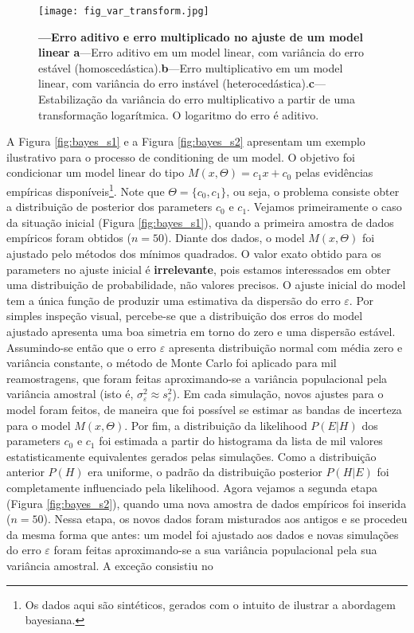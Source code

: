 \documentclass[./main.tex]{subfiles}
\begin{document}
\begin{figure}[t!] %
	\centering				
	\texttt{[image: fig\_var\_transform.jpg]}		
	\caption[Erro aditivo e erro multiplicativo]
	{\textbf{---\;Erro aditivo e erro multiplicado no ajuste de um \gls{model} linear}
        \;\textbf{a}\;---\;Erro aditivo em um \gls{model} linear, com variância do erro estável (homoscedástica).\;\textbf{b}\;---\;Erro multiplicativo em um \gls{model} linear, com variância do erro instável (heterocedástica).\;\textbf{c}\;---\;Estabilização da variância do erro multiplicativo a partir de uma transformação logarítmica. O logaritmo do erro é aditivo.
	}
\label{fig:var_transform}  %
\end{figure}
\par A Figura \ref{fig:bayes_s1} e a Figura \ref{fig:bayes_s2} apresentam um exemplo ilustrativo para o processo de \gls{conditioning} de um \gls{model}. O objetivo foi condicionar um \gls{model} linear do tipo $M(x, \Theta) = c_{1}x + c_{0}$ pelas evidências empíricas disponíveis\footnote{Os dados aqui são sintéticos, gerados com o intuito de ilustrar a abordagem bayesiana.}. Note que $\Theta=\{c_{0}, c_{1}\}$, ou seja, o problema consiste obter a distribuição de \gls{posterior} dos \gls{parameters} $c_0$ e $c_1$. Vejamos primeiramente o caso da situação inicial (Figura \ref{fig:bayes_s1}), quando a primeira amostra de dados empíricos foram obtidos ($n=50$). Diante dos dados, o \gls{model} $M(x, \Theta)$ foi ajustado pelo métodos dos mínimos quadrados. O valor exato obtido para os \gls{parameters} no ajuste inicial é \textbf{irrelevante}, pois estamos interessados em obter uma distribuição de probabilidade, não valores precisos. O ajuste inicial do \gls{model} tem a única função de produzir uma estimativa da dispersão do erro $\varepsilon$. Por simples inspeção visual, percebe-se que a distribuição dos erros do \gls{model} ajustado apresenta uma boa simetria em torno do zero e uma dispersão estável. Assumindo-se então que o erro $\varepsilon$ apresenta distribuição normal com média zero e variância constante, o método de Monte Carlo foi aplicado para mil reamostragens, que foram feitas aproximando-se a variância populacional pela variância amostral (isto é, $\sigma^2_\varepsilon \approx s^2_\varepsilon$). Em cada simulação, novos ajustes para o \gls{model} foram feitos, de maneira que foi possível se estimar as bandas de incerteza para o \gls{model} $M(x, \Theta)$.  Por fim, a distribuição da \gls{likelihood} $P(E | H)$ dos \gls{parameters} $c_0$ e $c_1$ foi estimada a partir do histograma da lista de mil valores estatisticamente equivalentes gerados pelas simulações. Como a distribuição anterior $P(H)$ era uniforme, o padrão da distribuição posterior $P(H | E)$ foi completamente influenciado pela \gls{likelihood}. Agora vejamos a segunda etapa (Figura \ref{fig:bayes_s2}), quando uma nova amostra de dados empíricos foi inserida ($n=50$). Nessa etapa, os novos dados foram misturados aos antigos e se procedeu da mesma forma que antes: um \gls{model} foi ajustado aos dados e novas simulações do erro $\varepsilon$ foram feitas aproximando-se a sua variância populacional pela sua variância amostral. A exceção consistiu no 
\end{document}
